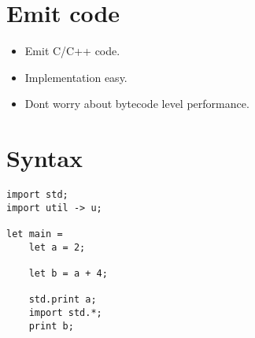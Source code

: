 \documentclass[11pt]{article}
\begin{document}
\section{Emit code}
\begin{itemize}
    \item Emit C/C++ code.
    \item Implementation easy.
    \item Dont worry about bytecode level performance.
\end{itemize}

\section{Syntax}
\begin{verbatim}
import std;
import util -> u;

let main =
    let a = 2;

    let b = a + 4;

    std.print a;
    import std.*;
    print b;
\end{verbatim}
\end{document}
